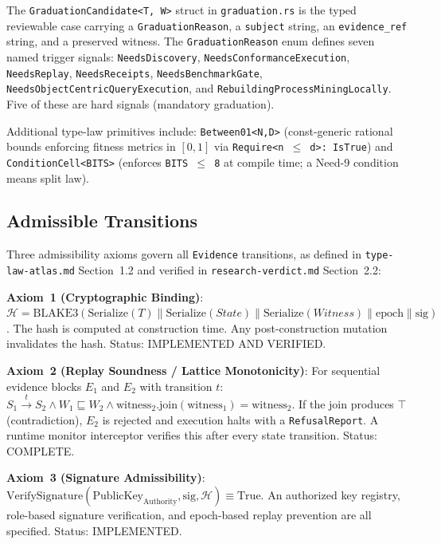 The \texttt{GraduationCandidate<T, W>} struct in \texttt{graduation.rs} is the typed
reviewable case carrying a \texttt{GraduationReason}, a \texttt{subject} string, an
\texttt{evidence\_ref} string, and a preserved witness. The \texttt{GraduationReason}
enum defines seven named trigger signals: \texttt{NeedsDiscovery},
\texttt{NeedsConformanceExecution}, \texttt{NeedsReplay}, \texttt{NeedsReceipts},
\texttt{NeedsBenchmarkGate}, \texttt{NeedsObjectCentricQueryExecution}, and
\texttt{RebuildingProcessMiningLocally}. Five of these are hard signals (mandatory graduation).

Additional type-law primitives include: \texttt{Between01<N,D>} (const-generic rational
bounds enforcing fitness metrics in $[0, 1]$ via \texttt{Require<n \(\leq\) d>: IsTrue})
and \texttt{ConditionCell<BITS>} (enforces \texttt{BITS \(\leq\) 8} at compile time;
a Need-9 condition means split law).

\subsection{Admissible Transitions}
\label{sec:sources-wasm4pm-compat-architecture-transitions}

Three admissibility axioms govern all \texttt{Evidence} transitions, as defined in
\texttt{type-law-atlas.md} Section~1.2 and verified in \texttt{research-verdict.md}
Section~2.2:

\textbf{Axiom~1 (Cryptographic Binding)}: $\mathcal{H} = \text{BLAKE3}(\text{Serialize}(T)
\parallel \text{Serialize}(State) \parallel \text{Serialize}(Witness) \parallel
\text{epoch} \parallel \text{sig})$. The hash is computed at construction time. Any
post-construction mutation invalidates the hash. Status: IMPLEMENTED AND VERIFIED.

\textbf{Axiom~2 (Replay Soundness / Lattice Monotonicity)}: For sequential evidence blocks
$E_1$ and $E_2$ with transition $t$: $S_1 \xrightarrow{t} S_2 \wedge W_1 \sqsubseteq W_2
\wedge \text{witness}_2.\text{join}(\text{witness}_1) = \text{witness}_2$. If the join
produces $\top$ (contradiction), $E_2$ is rejected and execution halts with a
\texttt{RefusalReport}. A runtime monitor interceptor verifies this after every state
transition. Status: COMPLETE.

\textbf{Axiom~3 (Signature Admissibility)}: $\text{VerifySignature}(\text{PublicKey}_{\text{Authority}},
\text{sig}, \mathcal{H}) \equiv \text{True}$. An authorized key registry, role-based
signature verification, and epoch-based replay prevention are all specified. Status: IMPLEMENTED.

